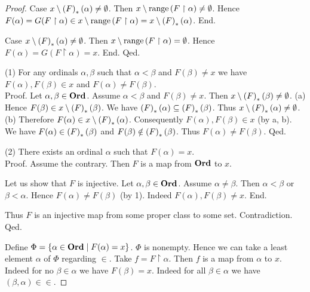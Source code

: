 \documentclass[../set-theory.tex]{subfiles}
\begin{document}
\begin{forthel}
\begin{proof}
        Case $x \setminus \left(F\right)_{*}(\alpha) \neq \emptyset$.
          Then $x \setminus \mathrm{range}\left(F \restriction \alpha\right) \neq \emptyset$.
          Hence $F(\alpha)
            = G(F \restriction \alpha)
            \in x \setminus \mathrm{range}\left(F \restriction \alpha\right)
            = x \setminus \left(F\right)_{*}(\alpha)$.
        End.

        Case $x \setminus \left(F\right)_{*}(\alpha) \neq \emptyset$.
          Then $x \setminus \mathrm{range}\left(F \restriction \alpha\right) = \emptyset$.
          Hence $F(\alpha)
            = G(F \restriction \alpha)
            = x$.
        End.
      Qed.

      (1) For any ordinals $\alpha, \beta$ such that $\alpha \less \beta$ and
      $F(\beta) \neq x$ we have $F(\alpha), F(\beta) \in x$ and $F(\alpha) \neq
      F(\beta)$. \\
      Proof.
        Let $\alpha, \beta \in \mathbf{Ord}$.
        Assume $\alpha \less \beta$ and $F(\beta) \neq x$.
        Then $x \setminus \left(F\right)_{*}(\beta) \neq \emptyset$.
        (a) Hence $F(\beta) \in x \setminus \left(F\right)_{*}(\beta)$.
        We have $\left(F\right)_{*}(\alpha) \subseteq \left(F\right)_{*}(\beta)$.
        Thus $x \setminus \left(F\right)_{*}(\alpha) \neq \emptyset$.
        (b) Therefore $F(\alpha) \in x \setminus \left(F\right)_{*}(\alpha)$.
        Consequently $F(\alpha), F(\beta) \in x$ (by a, b).
        We have $F(\alpha) \in \left(F\right)_{*}(\beta)$ and $F(\beta) \notin \left(F\right)_{*}(\beta)$.
        Thus $F(\alpha) \neq F(\beta)$.
      Qed.

      (2) There exists an ordinal $\alpha$ such that $F(\alpha) = x$. \\
      Proof.
        Assume the contrary.
        Then $F$ is a map from $\mathbf{Ord}$ to $x$.

        Let us show that $F$ is injective.
          Let $\alpha, \beta \in \mathbf{Ord}$.
          Assume $\alpha \neq \beta$.
          Then $\alpha \less \beta$ or $\beta \less \alpha$.
          Hence $F(\alpha) \neq F(\beta)$ (by 1).
          Indeed $F(\alpha), F(\beta) \neq x$.
        End.

        Thus $F$ is an injective map from some proper class to some set.
        Contradiction.
      Qed.

      Define $\Phi = \{ \alpha \in \mathbf{Ord} \mid F(\alpha) = x \}$.
      $\Phi$ is nonempty.
      Hence we can take a least element $\alpha$ of $\Phi$ regarding ${\in}$.
      Take $f = F \restriction \alpha$.
      Then $f$ is a map from $\alpha$ to $x$.
      Indeed for no $\beta \in \alpha$ we have $F(\beta) = x$.
      Indeed for all $\beta \in \alpha$ we have $(\beta, \alpha) \in {\in}$.


\end{proof}
\end{forthel}
\end{document}

